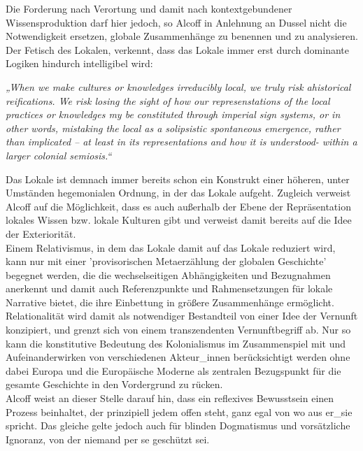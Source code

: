 \noindent Die Forderung nach Verortung und damit nach kontextgebundener Wissensproduktion
darf hier  jedoch, so Alcoff in Anlehnung an Dussel nicht die Notwendigkeit
ersetzen, globale Zusammenhänge zu benennen und zu analysieren. Der Fetisch des
Lokalen, verkennt, dass das Lokale immer erst durch dominante Logiken hindurch
intelligibel wird:
\begin{myenv}
    \textit{„When we make cultures or knowledges irreducibly local, we truly
    risk ahistorical reifications. We risk losing the sight of how our
    represenstations of the local practices or knowledges my be constituted
    through imperial sign systems, or in other words, mistaking the local as a
    solipsistic spontaneous emergence, rather than implicated – at least in its
    representations and how it is understood- within a larger colonial
    semiosis.“\footnotemark {}}
\end{myenv}
Das Lokale ist demnach immer bereits schon ein Konstrukt einer höheren, unter
Umständen hegemonialen Ordnung, in der das Lokale aufgeht. Zugleich verweist
Alcoff auf die Möglichkeit, dass es auch außerhalb der Ebene der Repräsentation
lokales Wissen bzw. lokale Kulturen gibt und verweist damit bereits auf die Idee
der Exteriorität.\\
Einem Relativismus, in dem das Lokale damit auf das Lokale reduziert wird, kann
nur mit einer 'provisorischen Metaerzählung der globalen Geschichte' begegnet
werden, die die wechselseitigen Abhängigkeiten und Bezugnahmen anerkennt und
damit auch Referenzpunkte und Rahmensetzungen für lokale Narrative bietet, die
ihre Einbettung in größere Zusammenhänge ermöglicht.\\
 Relationalität wird damit
als notwendiger Bestandteil von einer Idee der Vernunft konzipiert, und grenzt
sich von einem transzendenten Vernunftbegriff ab. Nur so kann die konstitutive
Bedeutung des Kolonialismus im Zusammenspiel mit und Aufeinanderwirken von
verschiedenen Akteur\_innen berücksichtigt werden ohne dabei Europa und die
Europäische Moderne als zentralen Bezugspunkt für die gesamte Geschichte in den
Vordergrund zu rücken.\\

\noindent Alcoff weist an dieser Stelle darauf hin, dass ein
reflexives Bewusstsein einen Prozess beinhaltet, der prinzipiell jedem offen
steht, ganz egal von wo aus er\_sie spricht. Das gleiche gelte jedoch auch für
blinden Dogmatismus und vorsätzliche Ignoranz, von der niemand per se geschützt
sei.\footnotemark {}

